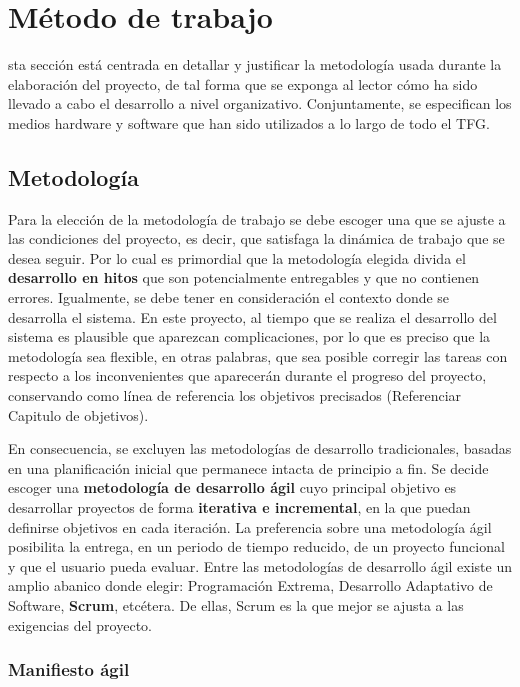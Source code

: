 \chapter{Método de trabajo}
\label{chap:metodo}

sta sección está centrada en detallar y justificar la metodología usada durante la elaboración del proyecto, de tal forma que se exponga al lector cómo ha sido llevado a cabo el desarrollo a nivel organizativo. Conjuntamente, se especifican los medios hardware y software que han sido utilizados a lo largo de todo el \acs{TFG}.

\section{Metodología}
\label{sec:metodologia}

Para la elección de la metodología de trabajo se debe escoger una que se ajuste a las condiciones del proyecto, es decir, que satisfaga la dinámica de trabajo que se desea seguir. Por lo cual es primordial que la metodología elegida divida el \textbf{desarrollo en hitos} que son potencialmente entregables y que no contienen errores. Igualmente, se debe tener en consideración el contexto donde se desarrolla el sistema. En este proyecto, al tiempo que se realiza el desarrollo del sistema es plausible que aparezcan complicaciones, por lo que es preciso que la metodología sea flexible, en otras palabras, que sea posible corregir las tareas con respecto a los inconvenientes que aparecerán durante el progreso del proyecto, conservando como línea de referencia los objetivos precisados (Referenciar Capitulo de objetivos).

En consecuencia, se excluyen las metodologías de desarrollo tradicionales, basadas en una planificación inicial que permanece intacta de principio a fin. Se decide escoger una \textbf{metodología de desarrollo ágil} cuyo principal objetivo es desarrollar proyectos de forma \textbf{iterativa e incremental}, en la que puedan definirse objetivos en cada iteración. La preferencia sobre una metodología ágil posibilita la entrega, en un periodo de tiempo reducido, de un proyecto funcional y que el usuario pueda evaluar. Entre las metodologías de desarrollo ágil existe un amplio abanico donde elegir: Programación Extrema, Desarrollo Adaptativo de Software, \textbf{Scrum}, etcétera. De ellas, Scrum es la que mejor se ajusta a las exigencias del proyecto.

\subsection{Manifiesto ágil}
\label{sec:manifiestoagil}

